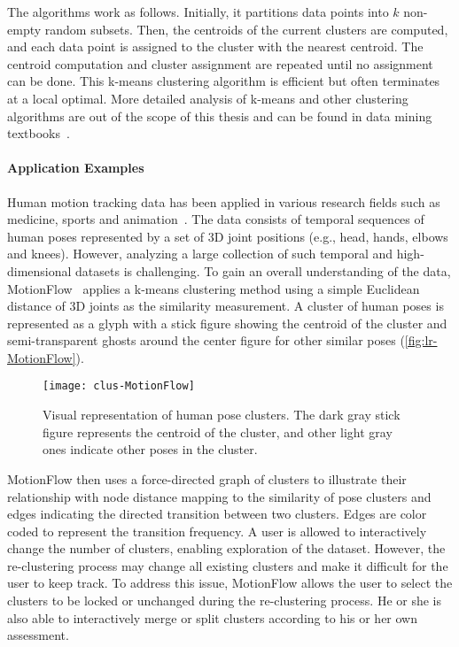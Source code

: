 The algorithms work as follows. Initially, it partitions data points into $k$ non-empty random subsets. Then, the centroids of the current clusters are computed, and each data point is assigned to the cluster with the nearest centroid. The centroid computation and cluster assignment are repeated until no assignment can be done. This k-means clustering algorithm is efficient but often terminates at a local optimal. More detailed analysis of k-means and other clustering algorithms are out of the scope of this thesis and can be found in data mining textbooks~\cite{Tan2006,Han2011}.

\paragraph{Application Examples}
Human motion tracking data has been applied in various research fields such as medicine, sports and animation~\cite{Bernard2013}. The data consists of temporal sequences of human poses represented by a set of 3D joint positions (e.g., head, hands, elbows and knees). However, analyzing a large collection of such temporal and high-dimensional datasets is challenging. To gain an overall understanding of the data, MotionFlow~\cite{Jang2016} applies a k-means clustering method using a simple Euclidean distance of 3D joints as the similarity measurement. A cluster of human poses is represented as a glyph with a stick figure showing the centroid of the cluster and semi-transparent ghosts around the center figure for other similar poses (\autoref{fig:lr-MotionFlow}).

\begin{figure}[!htb]
	\centering
	\texttt{[image: clus-MotionFlow]}
	\caption{Visual representation of human pose clusters. The dark gray stick figure represents the centroid of the cluster, and other light gray ones indicate other poses in the cluster. }
	\label{fig:lr-MotionFlow}
\end{figure}

MotionFlow then uses a force-directed graph of clusters to illustrate their relationship with node distance mapping to the similarity of pose clusters and edges indicating the directed transition between two clusters. Edges are color coded to represent the transition frequency. A user is allowed to interactively change the number of clusters, enabling exploration of the dataset. However, the re-clustering process may change all existing clusters and make it difficult for the user to keep track. To address this issue, MotionFlow allows the user to select the clusters to be locked or unchanged during the re-clustering process. He or she is also able to interactively merge or split clusters according to his or her own assessment.

